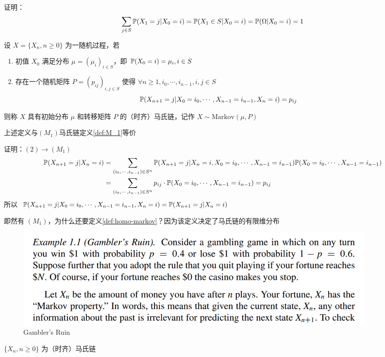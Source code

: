 证明：
\[
\sum_{j\in S}\mathbb{P}(X_1=j|X_0=i)=\mathbb{P}(X_1\in S|X_0=i)=\mathbb{P}(\Omega|X_0=i)=1
\]

\begin{definition}[时齐马氏链]\label{def:homo-markov}
    设 $X=\{X_n,n\geq 0\}$ 为一随机过程，若
    \begin{enumerate}
        \item 初值 $X_0$ 满足分布 $\mu=(\mu_i)_{i\in S}$，即 $\mathbb{P}(X_0=i)=\mu_i,i\in S$
        \item 存在一个随机矩阵 $P=(p_{ij})_{i,j\in S}$ 使得 $\forall n\geq 1,i_0,\cdots,i_{n-1},i,j\in S$
        \[
        \mathbb{P}(X_{n+1}=j|X_0=i_0,\cdots,X_{n-1}=i_{n-1},X_n=i)=p_{ij}
        \]
    \end{enumerate}
    则称 $X$ 具有初始分布 $\mu$ 和转移矩阵 $P$ 的（时齐）马氏链，记作 $X\sim \text{Markov}(\mu,P)$
\end{definition}

上述定义与$(M_1)$马氏链定义\ref{def:M_1}等价

证明：$(2)\rightarrow (M_1)$
\[
\begin{aligned}
    \mathbb{P}(X_{n+1}=j|X_n=i)&=\sum_{(i_0,\cdots,i_{n-1})\in S^n}\mathbb{P}(X_{n+1}=j|X_n=i,X_0=i_0,\cdots,X_{n-1}=i_{n-1})\mathbb{P}(X_0=i_0,\cdots,X_{n-1}=i_{n-1})\\
    &=\sum_{(i_0,\cdots,i_{n-1})\in S^n}p_{ij}\cdot \mathbb{P}(X_0=i_0,\cdots,X_{n-1}=i_{n-1})=p_{ij}
\end{aligned}
\]
所以 $\mathbb{P}(X_{n+1}=j|X_0=i_0,\cdots,X_{n-1}=i_{n-1},X_n=i)=\mathbb{P}(X_{n+1}=j|X_n=i)$

即然有 $(M_1)$，为什么还要定义\ref{def:homo-markov}？因为该定义决定了马氏链的有限维分布

\begin{example} 
    \begin{figure}[H]
        \centering
        \includegraphics[width=0.9\textwidth]{figures/Gambler's Ruin.png}
        \caption{Gambler's Ruin}
    \end{figure}
\end{example}

\begin{claim}
$\{X_n,n\geq 0\}$ 为（时齐）马氏链
\end{claim}

